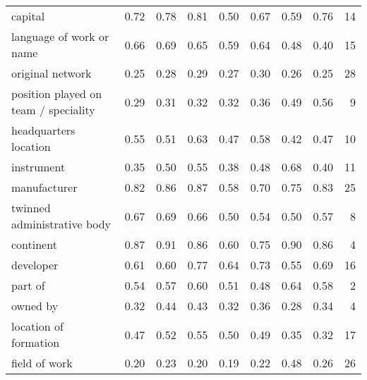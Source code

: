 \begin{table*}[t]
{\begin{tabular}{lrrrrrrrr}
                              capital &       0.72 &        0.78 &            0.81 &          0.50 &           0.67 &         0.59 &            0.76 &  14 \\
             language of work or name &       0.66 &        0.69 &            0.65 &          0.59 &           0.64 &         0.48 &            0.40 &  15 \\
                     original network &       0.25 &        0.28 &            0.29 &          0.27 &           0.30 &         0.26 &            0.25 &  28 \\
 position played on team / speciality &       0.29 &        0.31 &            0.32 &          0.32 &           0.36 &         0.49 &            0.56 &   9 \\
                headquarters location &       0.55 &        0.51 &            0.63 &          0.47 &           0.58 &         0.42 &            0.47 &  10 \\
                           instrument &       0.35 &        0.50 &            0.55 &          0.38 &           0.48 &         0.68 &            0.40 &  11 \\
                         manufacturer &       0.82 &        0.86 &            0.87 &          0.58 &           0.70 &         0.75 &            0.83 &  25 \\
          twinned administrative body &       0.67 &        0.69 &            0.66 &          0.50 &           0.54 &         0.50 &            0.57 &   8 \\
                            continent &       0.87 &        0.91 &            0.86 &          0.60 &           0.75 &         0.90 &            0.86 &   4 \\
                            developer &       0.61 &        0.60 &            0.77 &          0.64 &           0.73 &         0.55 &            0.69 &  16 \\
                              part of &       0.54 &        0.57 &            0.60 &          0.51 &           0.48 &         0.64 &            0.58 &   2 \\
                             owned by &       0.32 &        0.44 &            0.43 &          0.32 &           0.36 &         0.28 &            0.34 &   4 \\
                location of formation &       0.47 &        0.52 &            0.55 &          0.50 &           0.49 &         0.35 &            0.32 &  17 \\
                        field of work &       0.20 &        0.23 &            0.20 &          0.19 &           0.22 &         0.48 &            0.26 &  26 \\

\end{tabular}}
\end{table*}
